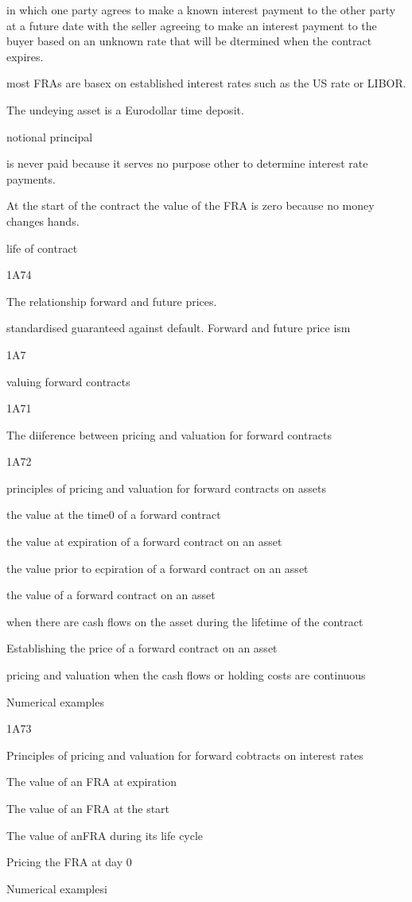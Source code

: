 in which one party agrees to make a known interest payment to the other party at a future date with the seller agreeing to make an interest payment to the buyer based on an unknown rate that will be dtermined when the contract expires.


 most FRAs are basex on established interest rates such as the US rate or LIBOR.


The undeying asset is a Eurodollar time deposit.


notional principal

is never paid because it serves no purpose other to determine interest rate payments.


At the start of the contract the value of the FRA is zero because no money changes hands.


life of contract



1A74

The relationship forward and future prices.


standardised guaranteed against default. Forward and future price ism


1A7


valuing forward contracts

1A71

The diiference between pricing and valuation for forward contracts


1A72

principles of pricing and valuation for forward contracts on assets

the value at the time0 of a forward contract

the value at expiration of a forward contract on an asset

the value prior to ecpiration of a forward contract on an asset

the value of a forward contract on an asset

when there are cash flows on the asset during the lifetime of the contract

Establishing the price of a forward contract on an asset

pricing and valuation when the cash flows or holding costs are continuous

Numerical examples


1A73

Principles of pricing and valuation for forward cobtracts on interest rates

The value of an FRA at expiration

The value of an FRA at the start

The value of anFRA during its life cycle

Pricing the FRA at day 0

Numerical examplesi

